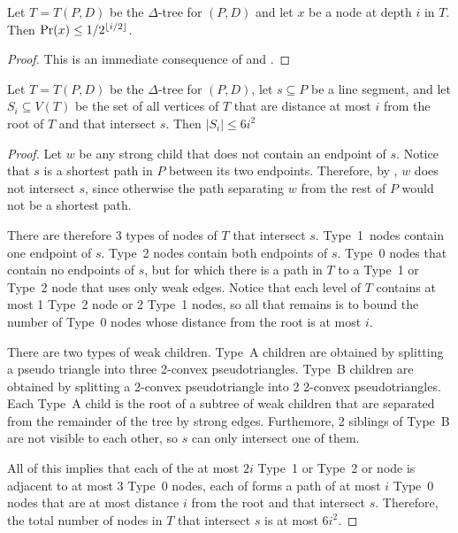 \documentclass[lotsofwhite]{patmorin}
\begin{document}
\begin{lem}
Let $T=T(P,D)$ be the $\Delta$-tree for $(P,D)$ and
let $x$ be a node at depth $i$ in $T$.  Then $\Pr(x)\le 1/2^{\left\lfloor i/2 \right\rfloor}$.
\end{lem}

\begin{proof}
This is an immediate consequence of  and
.
\end{proof}


\begin{lem}
Let $T=T(P,D)$ be the $\Delta$-tree for $(P,D)$, let $s\subseteq P$ be
a line segment, and let $S_i\subseteq V(T)$ be the set of all vertices
of $T$ that are distance at most $i$ from the root of $T$ and that
intersect $s$.  Then $|S_i|\le 6i^2$
\end{lem}

\begin{proof}
Let $w$ be any strong child that does not contain an endpoint of $s$.
Notice that $s$ is a shortest path in $P$ between its two endpoints.
Therefore, by , $w$ does not intersect $s$, since
otherwise the path separating $w$ from the rest of $P$ would not be a
shortest path.

There are therefore 3 types of nodes of $T$ that intersect $s$.
Type~1~nodes contain one endpoint of $s$. Type~2 nodes contain both
endpoints of $s$.  Type~0 nodes that contain no endpoints of $s$, but
for which there is a path in $T$ to a Type~1 or Type~2 node that uses
only weak edges.  Notice that each level of $T$ contains at most 1
Type~2 node or 2 Type~1 nodes, so all that remains is to bound the
number of Type~0 nodes whose distance from the root is at most $i$.

There are two types of weak children.  Type~A children are obtained by
splitting a pseudo triangle into three 2-convex pseudotriangles.
Type~B children are obtained by splitting a 2-convex pseudotriangle
into 2 2-convex pseudotriangles.  Each Type~A child is the root of a
subtree of weak children that are separated from the remainder of the
tree by strong edges.  Furthemore, 2 siblings of Type~B are not
visible to each other, so $s$ can only intersect one of them. 

All of this implies that each of the at most $2i$ Type~1 or Type~2 or
node is adjacent to at most 3 Type~0 nodes, each of forms a path of at
most $i$ Type~0 nodes that are at most distance $i$ from the root and
that intersect $s$.  Therefore, the total number of nodes in $T$ that
intersect $s$ is at most $6i^2$.
\end{proof}
\end{document}
